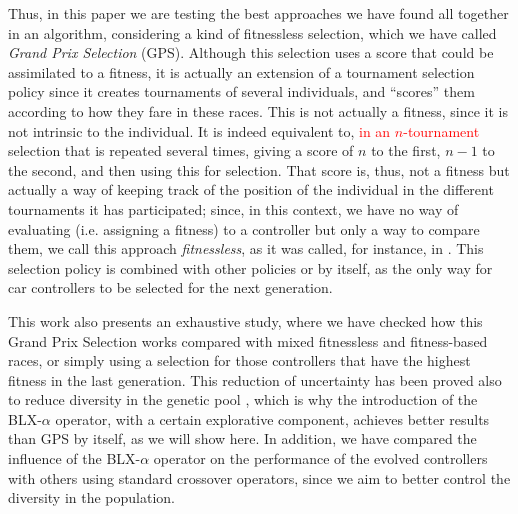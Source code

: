 \documentclass[10pt,journal,compsoc]{IEEEtran}
\begin{document}
Thus, in this paper we are testing the best approaches we have found all together in an algorithm, considering a kind of fitnessless selection, which we have called \textit{Grand Prix Selection} (GPS). Although this selection uses a score that could be assimilated to a fitness, it is actually an extension of a tournament selection policy since it creates tournaments of several individuals, and ``scores'' them according to how they fare in these races. This is not actually a fitness, since it is not intrinsic to the individual. It is indeed equivalent to,\textcolor{red}{ in an $n$-tournament} selection that is repeated several times, giving a score of $n$ to the first, $n-1$ to the second, and then using this for selection. That score is, thus, not a fitness but actually a way of keeping track of the position of the individual in the different tournaments it has participated; since, in this context, we have no way of evaluating (i.e. assigning a fitness) to a controller but only a way to compare them, we call this approach {\em fitnessless}, as it was called, for instance, in \cite{jaskowski2008winning}.
This selection policy is combined with other policies or by itself, as the only way for car controllers to be selected for the next generation.

This work also presents an exhaustive study, where we have checked how this Grand Prix Selection works compared with mixed fitnessless and fitness-based races, or simply using a selection for those controllers that have the highest fitness in the last generation.  
This reduction of uncertainty has been proved also to reduce diversity in the genetic pool \cite{DBLP:journals/tcci/MereloLFGCCRMGTCC16}, which is why the introduction of the \mbox{BLX-$\alpha$} operator, with a certain explorative component, achieves better results than GPS by itself, as we will show here.
In addition, we have compared the influence of the \mbox{BLX-$\alpha$} operator on the performance of the evolved controllers with others using standard crossover operators, since we aim to better control the diversity in the population.

\end{document}

